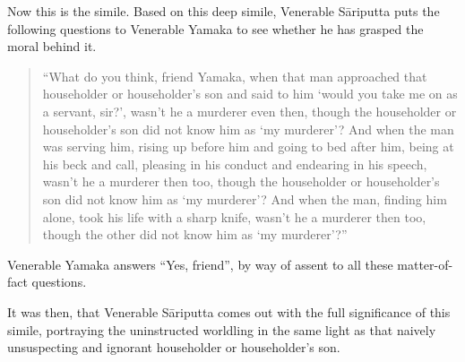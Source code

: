 Now this is the simile. Based on this deep simile, Venerable Sāriputta puts the following questions to Venerable Yamaka to see whether he has grasped the moral behind it.

\begin{quote}
``What do you think, friend Yamaka, when that man approached that householder or householder's son and said to him `would you take me on as a servant, sir?', wasn't he a murderer even then, though the householder or householder's son did not know him as `my murderer'? And when the man was serving him, rising up before him and going to bed after him, being at his beck and call, pleasing in his conduct and endearing in his speech, wasn't he a murderer then too, though the householder or householder's son did not know him as `my murderer'? And when the man, finding him alone, took his life with a sharp knife, wasn't he a murderer then too, though the other did not know him as `my murderer'?''
\end{quote}

Venerable Yamaka answers ``Yes, friend'', by way of assent to all these matter-of-fact questions.

It was then, that Venerable Sāriputta comes out with the full significance of this simile, portraying the uninstructed worldling in the same light as that naively unsuspecting and ignorant householder or householder's son.

